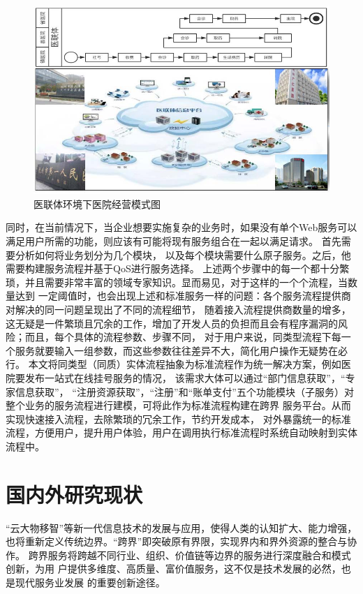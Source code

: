 \begin{figure}[htbp]
  \centering
  \includegraphics[scale=1]{./images/yilianti.jpg}
  \caption{医联体环境下医院经营模式图}
  \label{fig:yilianti}
\end{figure}

 同时，在当前情况下，当企业想要实施复杂的业务时，如果没有单个Web服务可以满足用户所需的功能，则应该有可能将现有服务组合在一起以满足请求。
 首先需要分析如何将业务划分为几个模块，
 以及每个模块需要什么原子服务。之后，他需要构建服务流程并基于QoS进行服务选择。
 上述两个步骤中的每一个都十分繁琐，并且需要非常丰富的领域专家知识。显而易见，对于这样的一个个流程，当数量达到
 一定阈值时，也会出现上述和标准服务一样的问题：各个服务流程提供商对解决的同一问题呈现出了不同的流程细节，
随着接入流程提供商数量的增多，这无疑是一件繁琐且冗余的工作，增加了开发人员的负担而且会有程序漏洞的风险；而且，每个具体的流程参数、步骤不同，
对于用户来说，同类型流程下每一个服务就要输入一组参数，而这些参数往往差异不大，简化用户操作无疑势在必行。
 本文将同类型（同质）实体流程抽象为标准流程作为统一解决方案，例如医院要发布一站式在线挂号服务的情况，
 该需求大体可以通过“部门信息获取”，“专家信息获取”，
 “注册资源获取”，“注册”和“账单支付”五个功能模块（子服务）对整个业务的服务流程进行建模，可将此作为标准流程构建在跨界
 服务平台。从而实现快速接入流程，去除繁琐的冗余工作，节约开发成本，
 对外暴露统一的标准流程，方便用户，提升用户体验，用户在调用执行标准流程时系统自动映射到实体流程中。


\section{国内外研究现状}

“云大物移智”等新一代信息技术的发展与应用，使得人类的认知扩大、能力增强，
也将重新定义传统边界。“跨界”即突破原有界限，实现界内和界外资源的整合与协作。
跨界服务将跨越不同行业、组织、价值链等边界的服务进行深度融合和模式创新，为用
户提供多维度、高质量、富价值服务，这不仅是技术发展的必然，也是现代服务业发展
的重要创新途径。

